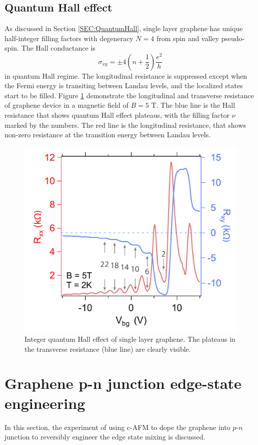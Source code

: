 \documentclass[pdflatex, sectionletters, 12pt]{pittetd}    %
\begin{document}
\subsection{Quantum Hall effect}

As discussed in Section \ref{SEC:QuantumHall}, single layer graphene has unique half-integer filling factors with degeneracy $N = 4$ from spin and valley pseudo-spin. The Hall conductance is
$$
\sigma_{xy} = \pm 4\left(n + \frac{1}{2}\right)\frac{e^2}{h}
$$
in quantum Hall regime. The longitudinal resistance is suppressed except when the Fermi energy is transiting between Landau levels, and the localized states start to be filled. Figure \ref{FIG:HallResistance} demonstrate the longitudinal and transverse resistance of graphene device in a magnetic field of $B = 5$ T. The blue line is the Hall resistance that shows quantum Hall effect plateaus, with the filling factor $\nu$ marked by the numbers. The red line is the longitudinal resistance, that shows non-zero resistance at the transition energy between Landau levels.
\\

\begin{figure}[h!]
	\centering
	\includegraphics[width=.55\textwidth]{Drawing/HallResistance.pdf}
	\caption{Integer quantum Hall effect of single layer graphene. The plateaus in the transverse resistance (blue line) are clearly visible.}
	\label{FIG:HallResistance}
\end{figure}

\section{Graphene p-n junction edge-state engineering}
\label{SEC:PNJunction}

In this section, the experiment of using c-AFM to dope the graphene into $p$-$n$ junction to reversibly engineer the edge state mixing is discussed.
\end{document}
